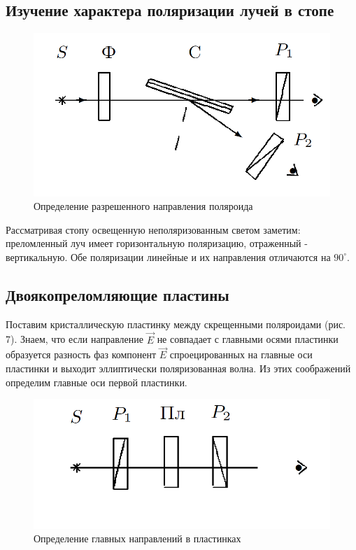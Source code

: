 \documentclass[a4paper, 12pt]{article}%
\begin{document}
	\subsection{Изучение характера поляризации лучей в стопе}
	\begin{figure}
		\includegraphics[width=\linewidth]{6}
		\caption{Определение разрешенного направления поляроида}
		\label{ris 6}
	\end{figure}
	Рассматривая стопу освещенную неполяризованным светом заметим: преломленный луч имеет горизонтальную поляризацию, отраженный - вертикальную. Обе поляризации линейные и их направления отличаются на $90^{\circ}$.
	\subsection{Двоякопреломляющие пластины}
	Поставим кристаллическую пластинку между скрещенными поляроидами (рис. 7). 
	Знаем, что если направление  $\vec{E}$ не совпадает с главными осями пластинки образуется разность фаз компонент $\vec{E}$ спроецированных на главные оси пластинки и выходит эллиптически поляризованная волна. Из этих соображений определим главные оси первой пластинки.
	
	\begin{figure}
		\includegraphics[width=\linewidth]{7}
		\caption{Определение главных
			направлений в пластинках}
		\label{ris 7}
	\end{figure}
	
\end{document}
